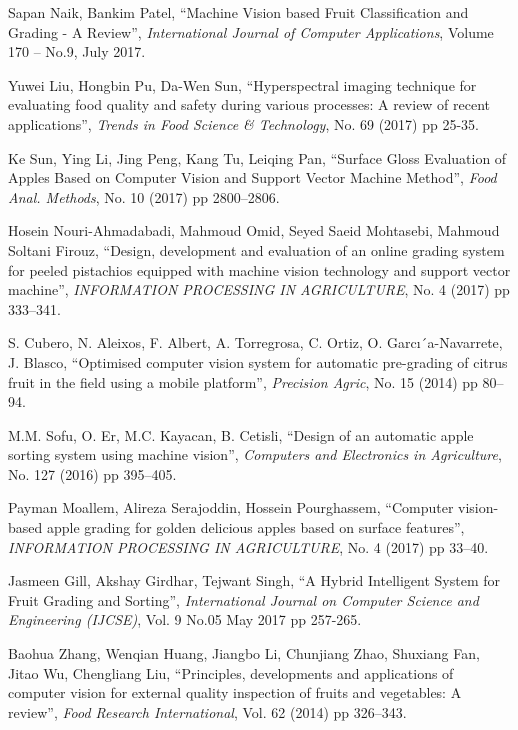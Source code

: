 \documentclass[conference]{IEEEtran}
\begin{document}
\begin{thebibliography}{1}
	Sapan Naik, Bankim Patel, ``Machine Vision based Fruit Classification and Grading - A Review'', {\em International Journal of Computer Applications}, Volume 170 – No.9, July 2017.
	
	Yuwei Liu, Hongbin Pu, Da-Wen Sun, ``Hyperspectral imaging technique for evaluating food quality and safety during various processes: A review of recent applications'', {\em Trends in Food Science \& Technology}, No. 69 (2017) pp 25-35.
	
	Ke Sun, Ying Li,  Jing Peng,  Kang Tu,  Leiqing Pan, ``Surface Gloss Evaluation of Apples Based on Computer Vision and Support Vector Machine Method'', {\em Food Anal. Methods}, No. 10 (2017) pp 2800–2806.
	
	Hosein Nouri-Ahmadabadi, Mahmoud Omid, Seyed Saeid Mohtasebi, Mahmoud Soltani Firouz, ``Design, development and evaluation of an online grading system for peeled pistachios equipped with machine vision technology and support vector machine'', {\em INFORMATION PROCESSING IN AGRICULTURE}, No. 4 (2017) pp 333–341.
	
	S. Cubero, N. Aleixos, F. Albert, A. Torregrosa, C. Ortiz, O. Garcı´a-Navarrete, J. Blasco, ``Optimised computer vision system for automatic pre-grading of citrus fruit in the field using a mobile platform'', {\em Precision Agric}, No. 15 (2014) pp 80–94.
	
	M.M. Sofu, O. Er, M.C. Kayacan, B. Cetisli, ``Design of an automatic apple sorting system using machine vision'', {\em Computers and Electronics in Agriculture}, No. 127 (2016) pp 395–405.
	
	Payman Moallem, Alireza Serajoddin, Hossein Pourghassem, ``Computer vision-based apple grading for golden delicious apples based on surface features'', {\em INFORMATION PROCESSING IN AGRICULTURE}, No. 4 (2017) pp 33–40.
	
	Jasmeen Gill, Akshay Girdhar, Tejwant Singh, ``A Hybrid Intelligent System for Fruit Grading and Sorting'', {\em  International Journal on Computer Science and Engineering (IJCSE)}, Vol. 9 No.05 May 2017 pp 257-265.
	
	Baohua Zhang, Wenqian Huang, Jiangbo Li, Chunjiang Zhao, Shuxiang Fan, Jitao Wu, Chengliang Liu, ``Principles, developments and applications of computer vision for external quality inspection of fruits and vegetables: A review'', {\em  Food Research International}, Vol. 62 (2014) pp 326–343.
	

\end{thebibliography}
\end{document}
